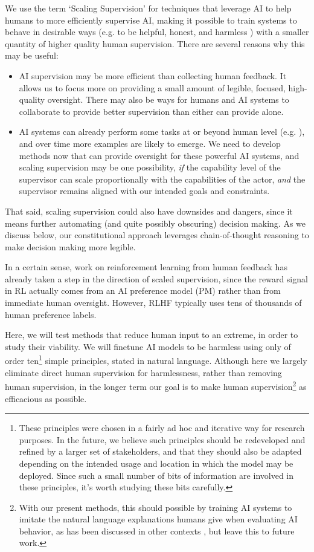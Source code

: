 \documentclass[english]{article}
\renewcommand\>{\rangle}
\begin{document}
We use the term `Scaling Supervision' for techniques that leverage AI to help humans to more efficiently supervise AI, making it possible to train systems to behave in desirable ways (e.g. to be helpful, honest, and harmless \cite{askell2021general}) with a smaller quantity of higher quality human supervision.  There are several reasons why this may be useful:
\begin{itemize}
    \item AI supervision may be more efficient than collecting human feedback. It allows us to focus more on providing a small amount of legible, focused, high-quality oversight. There may also be ways for humans and AI systems to collaborate \cite{BowmanSandwiching} to provide better supervision than either can provide alone.
    \item AI systems can already perform some tasks at or beyond human level (e.g. \cite{silver2017mastering}), and over time more examples are likely to emerge.  We need to develop methods now that can provide oversight for these powerful AI systems, and scaling supervision may be one possibility, \emph{if} the capability level of the supervisor can scale proportionally with the capabilities of the actor, \emph{and} the supervisor remains aligned with our intended goals and constraints.
\end{itemize}
That said, scaling supervision could also have downsides and dangers, since it means further automating (and quite possibly obscuring) decision making. As we discuss below, our constitutional approach leverages chain-of-thought reasoning \cite{ScratchPad, ChainOfThought} to make decision making more legible.  

In a certain sense, work on reinforcement learning from human feedback \cite{stiennon2020learning, bai2022training, InstructGPT} has already taken a step in the direction of scaled supervision, since the reward signal in RL actually comes from an AI preference model (PM) rather than from immediate human oversight. However, RLHF typically uses tens of thousands of human preference labels.  

Here, we will test methods that reduce human input to an extreme, in order to study their viability.  We will finetune AI models to be harmless  using only of order ten\footnote{These principles were chosen in a fairly ad hoc and iterative way for research purposes. In the future, we believe such principles should be redeveloped and refined by a larger set of stakeholders, and that they should also be adapted depending on the intended usage and location in which the model may be deployed. Since such a small number of bits of information are involved in these principles, it's worth studying these bits  carefully.} simple principles, stated in natural language.  Although here we largely eliminate direct human supervision for harmlessness, rather than removing human supervision, in the longer term our goal is to make human supervision\footnote{With our present methods, this should possible by training AI systems to imitate the natural language explanations humans give when evaluating AI behavior, as has been discussed in other contexts  \cite{PerezLanguageFeedback, OAISelfCritique}, but leave this to future work.} as efficacious as possible.  
\end{document}
